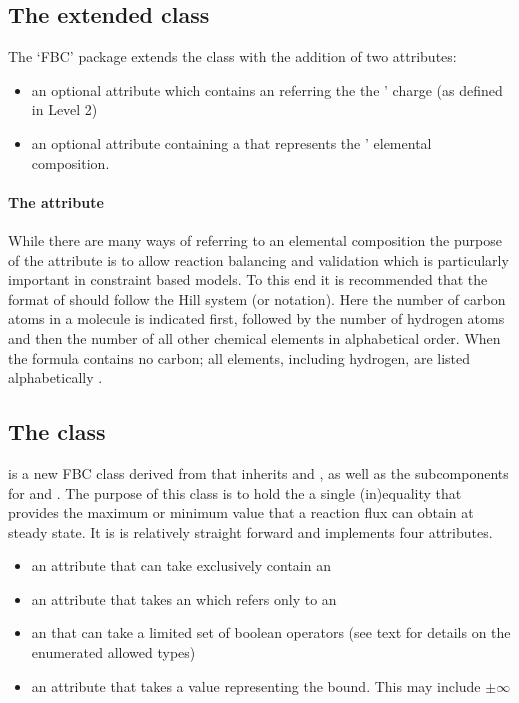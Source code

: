 \subsection{The extended  class}
\label{sbml-species}
\label{species-class}

The `FBC' package extends the \SBML \Species class with the addition of two attributes:
\begin{itemize}
  \item an optional attribute  which contains an  referring the the \Species' charge (as defined in \SBML Level 2)
  \item an optional attribute  containing a  that represents the \Species' elemental composition.
\end{itemize}

\paragraph{The  attribute}
\label{chemicalFormula-attribute}
While there are many ways of referring to an elemental composition the purpose of the  attribute is to allow reaction balancing and validation which is particularly important in constraint based models. To this end it is recommended that the format of  should follow the Hill system (or notation). Here the number of carbon atoms in a molecule is indicated first, followed by the number of hydrogen atoms and then the number of all other chemical elements in alphabetical order. When the formula contains no carbon; all elements, including hydrogen, are listed alphabetically \cite{hillsystem, hillwikipedia}.

\subsection{The  class}
\label{fluxbound-class}

\FluxBound is a new FBC class derived from \SBML \SBase that inherits  and , as well as the subcomponents for \Annotation and \Notes. The purpose of this class is to hold the a single (in)equality that provides the maximum or minimum value that a reaction flux can obtain at steady state. It is is relatively straight forward and implements four attributes.

\begin{itemize}
  \item {} an attribute that can take exclusively contain an 
  \item {} an attribute that takes an  which refers only to an \SBML \Reaction
  \item {} an  that can take a limited set of boolean operators (see text for details on the enumerated allowed types)
  \item {} an attribute that takes a  value representing the bound. This may include $\pm\infty$ 
\end{itemize}

